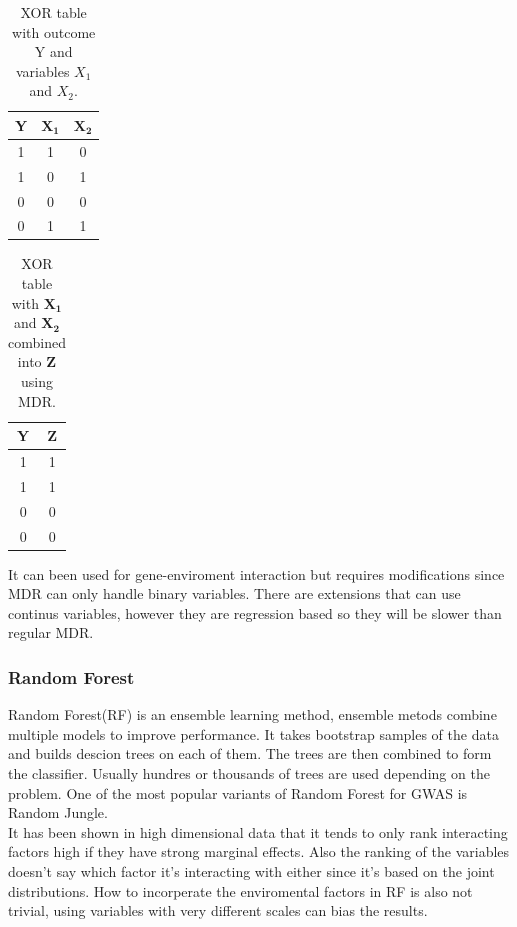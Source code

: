 \documentclass[10pt,a4paper]{article}
\begin{document}
\begin{table}[h]
\begin{tabular}{ | c | c | c | }
  \hline
  \textbf{Y} & $\mathbf{X_1}$ & $\mathbf{X_2}$ \\
  \hline
  1 & 1 & 0 \\
  \hline 
  1 & 0 & 1 \\
  \hline
  0 & 0 & 0 \\
  \hline
  0 & 1 & 1 \\
  \hline
\end{tabular}
\caption{XOR table with outcome Y and variables $X_1$ and $X_2$.}
\label{table:xor_table}
\end{table}
\begin{table}[h]
\begin{tabular}{ | c | c | }
  \hline
  \textbf{Y} & \textbf{Z} \\
  \hline
  1 & 1 \\
  \hline
  1 & 1 \\
  \hline
  0 & 0 \\
  \hline
  0 & 0 \\
  \hline
\end{tabular}
\caption{XOR table with $\mathbf{X_1}$ and $\mathbf{X_2}$ combined into $\mathbf{Z}$ using MDR.}
\label{table:xor_mdr_table}
\end{table}

It can been used for gene-enviroment interaction but requires modifications since MDR can only handle binary variables. There are extensions that can use continus variables, however they are regression based so they will be slower than regular MDR.\cite{gene_enviroment_2013}

\subsubsection{Random Forest}
Random Forest(RF) is an ensemble learning method, ensemble metods combine multiple models to improve performance. It takes bootstrap samples of the data and builds descion trees on each of them. The trees are then combined to form the classifier. Usually hundres or thousands of trees are used depending on the problem\cite{random_forest}. One of the most popular variants of Random Forest for GWAS is Random Jungle\cite{random_jungle}.
\\
It has been shown in high dimensional data that it tends to only rank interacting factors high if they have strong marginal effects\cite{winham_rf_2012}. Also the ranking of the variables doesn't say which factor it's interacting with either since it's based on the joint distributions\cite{gene_enviroment_2013}. How to incorperate the enviromental factors in RF is also not trivial, using variables with very different scales can bias the results\cite{gene_enviroment_2013}.
\end{document}
